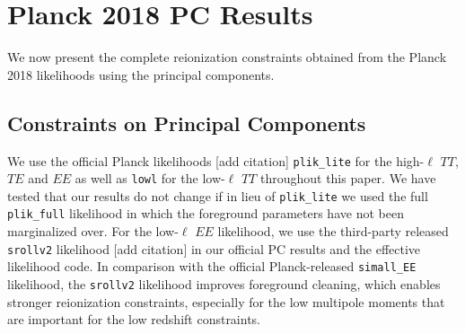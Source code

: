 \documentclass[prd,twocolumn,amsmath,amssymb,floatfix,superscriptaddress,nofootinbib]{revtex4-1}
\begin{document}
\section{Planck 2018 PC Results}
\label{sec:results}
We now present the complete reionization constraints obtained from the Planck 2018 likelihoods using the principal components.
\subsection{Constraints on Principal Components}
We use the official Planck likelihoods [add citation] \texttt{plik\_lite} for the high-$\ell$ $TT$, $TE$ and $EE$ as well as \texttt{lowl} for the low-$\ell$ $TT$ throughout this paper. We have tested that our results do not change if in lieu of \texttt{plik\_lite} we used the full \texttt{plik\_full} likelihood in which the foreground parameters have not been marginalized over. For the low-$\ell$ $EE$ likelihood, we use the third-party released \texttt{srollv2} likelihood [add citation] in our official PC results and the effective likelihood code. In comparison with the official Planck-released \texttt{simall\_EE} likelihood, the \texttt{srollv2} likelihood improves foreground cleaning, 
which enables stronger reionization constraints, especially for the low multipole moments that are important for the low redshift constraints.

\end{document}
